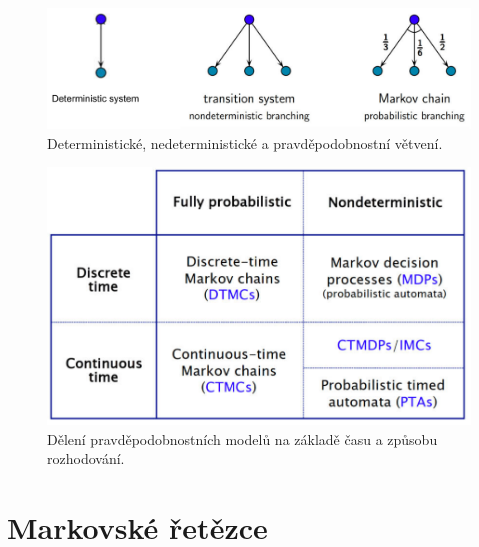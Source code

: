\begin{figure}[H]
    \centering
    \includegraphics[width=1\linewidth]{branches.pdf}
    \caption{Deterministické, nedeterministické a pravděpodobnostní větvení.}
\end{figure}

\begin{figure}[H]
    \centering
    \includegraphics[width=0.6\linewidth]{modelovani_pravdepodobnostnich_systemu.pdf}
    \caption{Dělení pravděpodobnostních modelů na základě času a způsobu rozhodování.}
\end{figure}


\section{Markovské řetězce}


